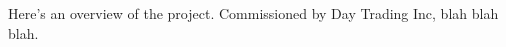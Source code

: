 \begin{Overview}

Here's an overview of the project. Commissioned by Day Trading Inc, blah blah blah.

\end{Overview}